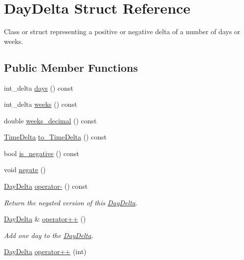\hypertarget{structDayDelta}{\section{\-Day\-Delta \-Struct \-Reference}
\label{structDayDelta}
}


\-Class or struct representing a positive or negative delta of a number of days or weeks.  


\subsection*{\-Public \-Member \-Functions}
\begin{DoxyCompactItemize}
\item 
int\-\_\-delta \hyperlink{structDayDelta_af7d15328d1c97bbd3316f014c69a6e3b}{days} () const 
\item 
int\-\_\-delta \hyperlink{structDayDelta_a48287489831fa9ec472451487908e663}{weeks} () const 
\item 
double \hyperlink{structDayDelta_adf33ed4a012b6326d2d172d1f7420ab1}{weeks\-\_\-decimal} () const 
\item 
\hyperlink{structTimeDelta}{\-Time\-Delta} \hyperlink{structDayDelta_a4e95505d0c45e5cc01d74259df3e4868}{to\-\_\-\-Time\-Delta} () const 
\item 
bool \hyperlink{structDayDelta_a10d6b9eac43322a957f7c3dfbedc2862}{is\-\_\-negative} () const 
\item 
void \hyperlink{structDayDelta_a23b9453556a255f5413aee21b12938a6}{negate} ()
\item 
\hyperlink{structDayDelta}{\-Day\-Delta} \hyperlink{structDayDelta_ab147a13f61362001a4acdaa1b782d1cf}{operator-\/} () const 
\begin{DoxyCompactList}\small\item\em \-Return the negated version of this \hyperlink{structDayDelta}{\-Day\-Delta}. \end{DoxyCompactList}\item 
\hyperlink{structDayDelta}{\-Day\-Delta} \& \hyperlink{structDayDelta_aa0a78ca9d3a6a3241211e22d638e0323}{operator++} ()
\begin{DoxyCompactList}\small\item\em \-Add one day to the \hyperlink{structDayDelta}{\-Day\-Delta}. \end{DoxyCompactList}\item 
\hyperlink{structDayDelta}{\-Day\-Delta} \hyperlink{structDayDelta_a6f5ca65ca16018cdf39bd5543cbec127}{operator++} (int)

\end{DoxyCompactItemize}
